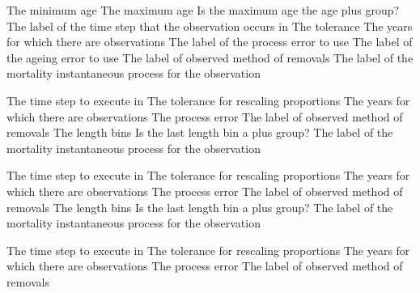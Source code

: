 \par\textbf{}\par
{} {The minimum age}
 {The maximum age}
 {Is the maximum age the age plus group?}
 {The label of the time step that the observation occurs in}
 {The tolerance}
 {The years for which there are observations}
 {The label of the process error to use}
 {The label of the ageing error to use}
 {The label of observed method of removals}
 {The label of the mortality instantaneous process for the observation}
\par\textbf{}\par
{} {The time step to execute in}
 {The tolerance for rescaling proportions}
 {The years for which there are observations}
 {The process error}
 {The label of observed method of removals}
 {The length bins}
 {Is the last length bin a plus group?}
 {The label of the mortality instantaneous process for the observation}
\par\textbf{}\par
{} {The time step to execute in}
 {The tolerance for rescaling proportions}
 {The years for which there are observations}
 {The process error}
 {The label of observed method of removals}
 {The length bins}
 {Is the last length bin a plus group?}
 {The label of the mortality instantaneous process for the observation}
\par\textbf{}\par
{} {The time step to execute in}
 {The tolerance for rescaling proportions}
 {The years for which there are observations}
 {The process error}
 {The label of observed method of removals}
